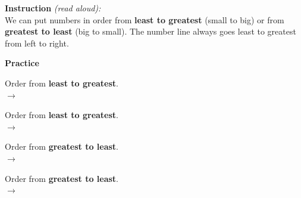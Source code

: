 \documentclass[12pt,letterpaper]{article}
\begin{document}

\begin{instructbox}
\noindent\textbf{\color{sd-blue}Instruction} \textit{(read aloud):}\\[4pt]
We can put numbers in order from \textbf{least to greatest} (small to big)
or from \textbf{greatest to least} (big to small).
The number line always goes least to greatest from left to right.
\end{instructbox}

\vspace{6pt}
\begin{center}
\end{center}

\goldrule
\noindent\textbf{\color{sd-blue}Practice}
\vspace{6pt}

\prob Order from \textbf{least to greatest}.\\[6pt]
\hspace{1cm}{\Large 5 \quad 2 \quad 8} \quad$\longrightarrow$\quad
\ansblank\quad\ansblank\quad\ansblank

\vspace{10pt}
\prob Order from \textbf{least to greatest}.\\[6pt]
\hspace{1cm}{\Large 10 \quad 3 \quad 7 \quad 1} \quad$\longrightarrow$\quad
\ansblank\quad\ansblank\quad\ansblank\quad\ansblank

\vspace{10pt}
\prob Order from \textbf{greatest to least}.\\[6pt]
\hspace{1cm}{\Large 4 \quad 9 \quad 6} \quad$\longrightarrow$\quad
\ansblank\quad\ansblank\quad\ansblank

\vspace{10pt}
\prob Order from \textbf{greatest to least}.\\[6pt]
\hspace{1cm}{\Large 0 \quad 5 \quad 8 \quad 3} \quad$\longrightarrow$\quad
\ansblank\quad\ansblank\quad\ansblank\quad\ansblank
\end{document}
